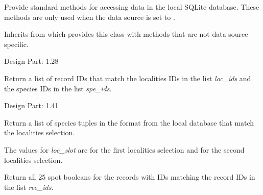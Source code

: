\documentclass[letterpaper,10pt,english]{sphinxmanual}
\begin{document}
\begin{fulllineitems}
\label{setlyze/database:setlyze.database.AccessLocalDB}
Provide standard methods for accessing data in the local
SQLite database. These methods are only used when the data source
is set to .

Inherits from {\hyperref[setlyze/database:setlyze.database.AccessDBGeneric]{}} which provides this
class with methods that are not data source specific.

Design Part: 1.28

\begin{fulllineitems}
\label{setlyze/database:setlyze.database.AccessLocalDB.get_record_ids}
Return a list of record IDs that match the localities IDs
in the list \emph{loc\_ids} and the species IDs in the list \emph{spe\_ids}.

Design Part: 1.41

\end{fulllineitems}


\begin{fulllineitems}
\label{setlyze/database:setlyze.database.AccessLocalDB.get_species}
Return a list of species tuples in the format  from the local
database that match the localities selection.

The values for \emph{loc\_slot} are  for the first localities
selection and  for the second localities selection.

\end{fulllineitems}


\begin{fulllineitems}
\label{setlyze/database:setlyze.database.AccessLocalDB.get_spots}
Return all 25 spot booleans for the records with IDs matching
the record IDs in the list \emph{rec\_ids}.

\end{fulllineitems}


\end{fulllineitems}
\end{document}
